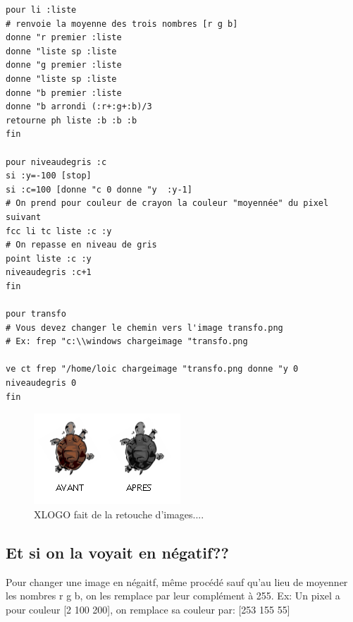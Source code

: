 \pagebreak
\begin{verbatim}
pour li :liste
# renvoie la moyenne des trois nombres [r g b]
donne "r premier :liste
donne "liste sp :liste
donne "g premier :liste
donne "liste sp :liste
donne "b premier :liste
donne "b arrondi (:r+:g+:b)/3
retourne ph liste :b :b :b
fin

pour niveaudegris :c
si :y=-100 [stop]
si :c=100 [donne "c 0 donne "y  :y-1]
# On prend pour couleur de crayon la couleur "moyennée" du pixel suivant
fcc li tc liste :c :y
# On repasse en niveau de gris
point liste :c :y
niveaudegris :c+1
fin

pour transfo
# Vous devez changer le chemin vers l'image transfo.png 
# Ex: frep "c:\\windows chargeimage "transfo.png 

ve ct frep "/home/loic chargeimage "transfo.png donne "y 0 niveaudegris 0
fin

\end{verbatim} 
\begin{figure}[h]
\includegraphics{bildoj/transfo.png}
\caption{XLOGO fait de la retouche d'images....}
\end{figure}

\subsection{Et si on la voyait en négatif??}
Pour changer une image en négaitf, même procédé sauf qu'au lieu de moyenner les nombres r g b, on les remplace par leur complément à 255. Ex: Un pixel a pour couleur [2 100 200], on remplace sa couleur par: [253 155 55]

